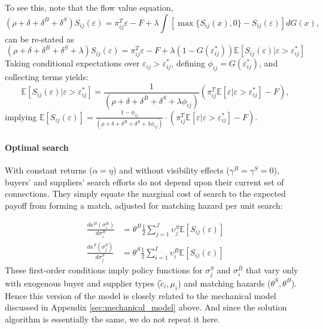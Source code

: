 \documentclass[12pt]{article} \usepackage{amsmath,amssymb,amsthm,geometry,graphicx,setspace,algorithm,algpseudocode,float}
\newcommand{\subsubsubsection}[1]{\paragraph{#1}}
\begin{document}
To see this, note that the flow value equation,
\[
\nonumber (\rho + \delta + \delta^B + \delta^S) S_{ij}(\varepsilon) =  \pi_{ij}^T \varepsilon - F + \lambda \int \left[ \max \{S_{ij}(x),0 \} - S_{ij}(\varepsilon)\right] dG(x),
\]
can be re-stated as 
\[\nonumber (\rho + \delta + \delta^B + \delta^S + \lambda) S_{ij}(\varepsilon) = \pi_{ij}^T \varepsilon - F + \lambda (1 - G(\varepsilon_{ij}^\ast)) \mathbb{E}\left[S_{ij}(\varepsilon)|\varepsilon>\varepsilon_{ij}^\ast \right]
\]
Taking conditional expectations over $  \varepsilon_{ij} > \varepsilon_{ij}^\ast$, defining $\phi_{ij} = G(\varepsilon_{ij}^\ast)$,  and collecting terms yields:
\[
  \mathbb{E}\left[S_{ij} (\varepsilon)|\varepsilon>\varepsilon_{ij}^\ast\right] = \frac{1}{(\rho + \delta + \delta^B + \delta^S + \lambda \phi_{ij})}\left(\pi_{ij}^T \mathbb{E}[\varepsilon | \varepsilon > \varepsilon_{ij}^\ast] - F\right) ,
\]
implying $\mathbb{E}\left[S_{ij}(\varepsilon)\right] =   
\frac{1 - \phi_{ij} }{(\rho + \delta + \delta^B + \delta^S + \lambda \phi_{ij}) } \cdot \left(\pi_{ij}^T \mathbb{E}[\varepsilon | \varepsilon > \varepsilon_{ij}^\ast] - F\right).$ 

\subsubsubsection{Optimal search}

With constant returns ($\alpha=\eta$) and without visibility effects ($\gamma^B=\gamma^S=0$), buyers' and suppliers' search efforts do not depend upon their current set of connections. They simply equate the marginal cost of search to the expected payoff from forming a match, adjusted for matching hazard per unit search:

\begin{align}
    \frac{d \kappa^B(\sigma_i^B)}{d \sigma_i^B} &= \theta^B \frac{1}{2}\sum_{j=1}^{J} \upsilon_j^S  \mathbb{E}\left[S_{ij}(\varepsilon)\right] 
    \label{eqn:buyer_foc}
\\
    \frac{d \kappa^S(\sigma_j^S)}{d \sigma_j^S} &= \theta^S \frac{1}{2}\sum_{i=1}^{I} \upsilon_i^B  \mathbb{E}\left[S_{ij}({\varepsilon})\right] 
    \label{eqn:seller_foc}
\end{align}
These first-order conditions imply policy functions for $\sigma_j^S$ and $\sigma_i^B$ that vary only with exogenous buyer and supplier types ($\tilde{c}_{i},\mu_i$) and matching hazards ($\theta^S,\theta^B$). Hence this version of the model is closely related to the mechanical model discussed in Appendix \ref{sec:mechanical_model} above. And since the solution algorithm is essentially the same, we do not repeat it here.
\par
\bigskip
\end{document}
